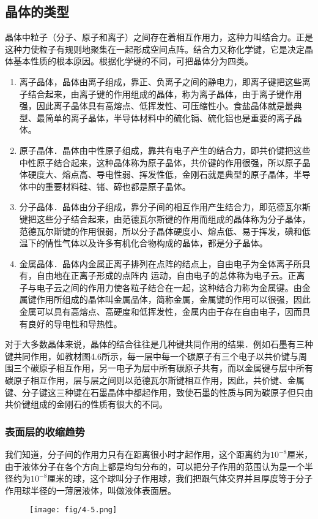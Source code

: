 \subsection{晶体的类型}

晶体中粒子（分子、原子和离子）之间存在着相互作用力，这种力叫结合力。正是这种力使粒子有规则地聚集在一起形成空间点阵。结合力又称化学键，它是决定晶体基本性质的根本原因。根据化学键的不同，可把晶体分为四类。
\begin{enumerate}
\item 离子晶体，晶体由离子组成，靠正、负离子之间的静电力，即离子键把这些离子结合起来，由离子键的作用组成的晶体，称为离子晶体，由于离子键作用强，因此离子晶体具有高熔点、低挥发性、可压缩性小。食盐晶体就是最典型、最简单的离子晶体，半导体材料中的硫化镉、硫化铝也是重要的离子晶体。
\item 原子晶体．晶体由中性原子组成，靠共有电子产生的结合力，即共价键把这些中性原子结合起来，这种晶体称为原子晶体，共价键的作用很强，所以原子晶体硬度大、熔点高、导电性弱、挥发性低，金刚石就是典型的原子晶体，半导体中的重要材料硅、锗、碲也都是原子晶体。
\item 分子晶体．晶体由分子组成，靠分子间的相互作用产生结合力，即范德瓦尔斯键把这些分子结合起来，由范德瓦尔斯键的作用而组成的晶体称为分子晶体，范德瓦尔斯键的作用很弱，所以分子晶体硬度小、熔点低、易于挥发，碘和低温下的情性气体以及许多有机化合物构成的晶体，都是分子晶体。
\item 金属晶体．晶体内金属正离子排列在点阵的结点上，自由电子为全体离子所具有，自由地在正离子形成的点阵内
运动，自由电子的总体称为电子云。正离子与电子云之间的作用力使各粒子结合在一起，这种结合力称为金属键。由金属键作用所组成的晶体叫金属品体，简称金属，金属键的作用可以很强，因此金属可以具有高熔点、高硬度和低挥发性，金属内由于存在自由电子，因而具有良好的导电性和导热性。
\end{enumerate}

对于大多数晶体来说，晶体的结合往往是几种键共同作用的结果．例如石墨有三种键共同作用，如教材图4.6所示，每一层中每一个碳原子有三个电子以共价键与周围三个碳原子相互作用，另一电子为层中所有碳原子共有，而以金属键与层中所有碳原子相互作用，层与层之间则以范德瓦尔斯键相互作用，因此，共价键、金属键、分子键这三种键在石墨晶体中都起作用，致使石墨的性质与同为碳原子但只由共价键组成的金刚石的性质有很大的不同。

\subsubsection{表面层的收缩趋势}
我们知道，分子间的作用力只有在距离很小时才起作用，这个距离约为$10^{-8}$厘米，由于液体分子在各个方向上都是均匀分布的，可以把分子作用的范围认为是一个半径约为$10^{-8}$厘米的球，这个球叫分子作用球，我们把跟气体交界并且厚度等于分子作用球半径的一薄层液体，叫做液体表面层。
\begin{figure}[htp]
    \centering
\texttt{[image: fig/4-5.png]}
    \caption{}
\end{figure}

